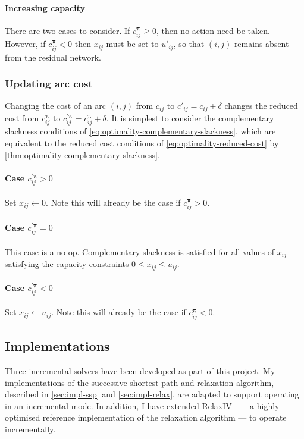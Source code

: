 \paragraph{Increasing capacity} 
There are two cases to consider. If $c_{ij}^{\boldsymbol{\pi}} \geq 0$, then no action need be taken. However, if $c_{ij}^{\boldsymbol{\pi}} < 0$ then $x_{ij}$ must be set to $u'_{ij}$, so that $(i,j)$ remains absent from the residual network.

\subsubsection{Updating arc cost}

Changing the cost of an arc $(i,j)$ from $c_{ij}$ to $c'_{ij} = c_{ij} + \delta$ changes the reduced cost from $c_{ij}^{\boldsymbol{\pi}}$ to $c_{ij}^{\prime\boldsymbol{\pi}} = c_{ij}^{\boldsymbol{\pi}} + \delta$. It is simplest to consider the complementary slackness conditions of \cref{eq:optimality-complementary-slackness}, which are equivalent to the reduced cost conditions of \cref{eq:optimality-reduced-cost} by \cref{thm:optimality-complementary-slackness}.

\paragraph{Case $c_{ij}^{\prime\boldsymbol{\pi}} > 0$}
Set $x_{ij} \gets 0$. Note this will already be the case if $c_{ij}^{\boldsymbol{\pi}} > 0$.

\paragraph{Case $c_{ij}^{\prime\boldsymbol{\pi}} = 0$}
This case is a no-op. Complementary slackness is satisfied for all values of $x_{ij}$ satisfying the capacity constraints $0 \leq x_{ij} \leq u_{ij}$.

\paragraph{Case $c_{ij}^{\prime\boldsymbol{\pi}} < 0$}
Set $x_{ij} \gets u_{ij}$. Note this will already be the case if $c_{ij}^{\boldsymbol{\pi}} < 0$.

\subsection{Implementations} \label{sec:impl-incremental-impl}

Three incremental solvers have been developed as part of this project. My implementations of the successive shortest path and relaxation algorithm, described in \cref{sec:impl-ssp} and \cref{sec:impl-relax}, are adapted to support operating in an incremental mode. In addition, I have extended RelaxIV~\cite{BertsekasCodes:1988,RelaxIV:2011} --- a highly optimised reference implementation of the relaxation algorithm --- to operate incrementally.

